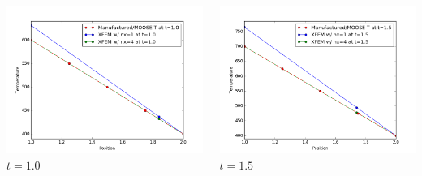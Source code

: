 \documentclass[]{beamer}
\begin{document}
\begin{frame}[t]
\begin{columns}
\begin{center}
			\includegraphics[scale=0.17]{figures/1D_rz_ls1m/1D_rz_ls1mat_u_vs_x_10}\\
			$t=1.0$
			\end{center}
			\begin{center}
			\includegraphics[scale=0.17]{figures/1D_rz_ls1m/1D_rz_ls1mat_u_vs_x_15}\\
			$t=1.5$			
			
			\null
			

\end{center}
\end{columns}
\end{frame}
\end{document}
